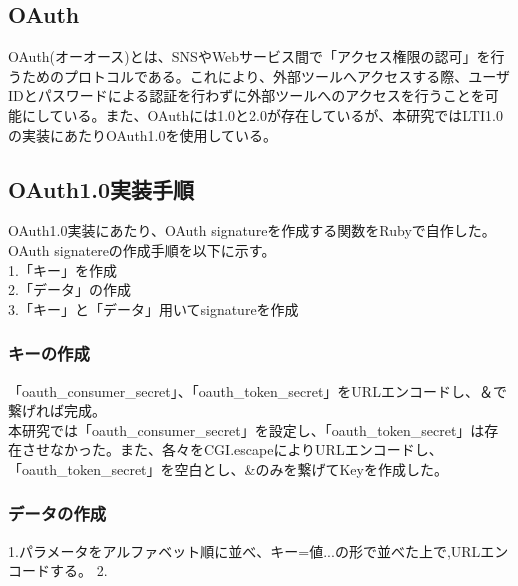 \subsection{OAuth}
OAuth(オーオース)とは、SNSやWebサービス間で「アクセス権限の認可」を行うためのプロトコルである。これにより、外部ツールへアクセスする際、ユーザIDとパスワードによる認証を行わずに外部ツールへのアクセスを行うことを可能にしている。また、OAuthには1.0と2.0が存在しているが、本研究ではLTI1.0の実装にあたりOAuth1.0を使用している。
\subsection{OAuth1.0実装手順}
OAuth1.0実装にあたり、OAuth signatureを作成する関数をRubyで自作した。\\
OAuth signatereの作成手順を以下に示す。\\
1.「キー」を作成\\
2.「データ」の作成\\
3.「キー」と「データ」用いてsignatureを作成\\
\subsubsection{キーの作成}
「oauth_consumer_secret」、「oauth_token_secret」をURLエンコードし、＆で繋げれば完成。\\
本研究では「oauth_consumer_secret」を設定し、「oauth_token_secret」は存在させなかった。また、各々をCGI.escapeによりURLエンコードし、「oauth_token_secret」を空白とし、&のみを繋げてKeyを作成した。
\subsubsection{データの作成}
1.パラメータをアルファベット順に並べ、キー=値...の形で並べた上で,URLエンコードする。
2.
